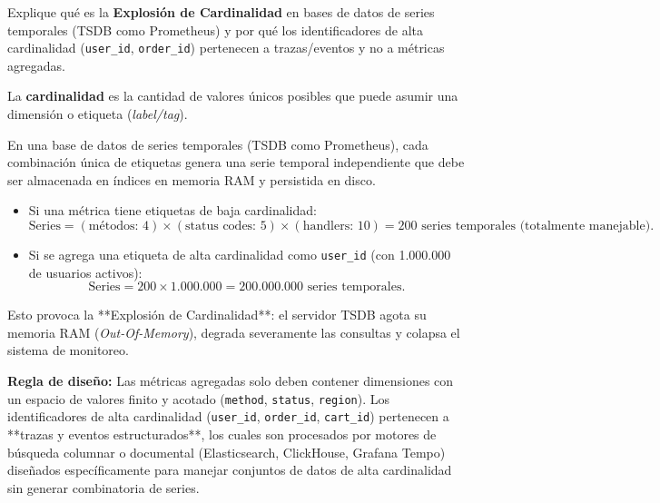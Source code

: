 \documentclass[variant=guia,cover=institutional,mode=screen]{ua-engineering-v6-article}
\begin{document}
\begin{uaexercise}
Explique qué es la \textbf{Explosión de Cardinalidad} en bases de datos de series temporales (TSDB como Prometheus) y por qué los identificadores de alta cardinalidad (\texttt{user\_id}, \texttt{order\_id}) pertenecen a trazas/eventos y no a métricas agregadas.
\end{uaexercise}
\begin{uaanswer}
La \textbf{cardinalidad} es la cantidad de valores únicos posibles que puede asumir una dimensión o etiqueta (\emph{label/tag}).

En una base de datos de series temporales (TSDB como Prometheus), cada combinación única de etiquetas genera una serie temporal independiente que debe ser almacenada en índices en memoria RAM y persistida en disco.
\begin{itemize}
\item Si una métrica tiene etiquetas de baja cardinalidad:
\[
\text{Series} = (\text{métodos: } 4) \times (\text{status codes: } 5) \times (\text{handlers: } 10) = 200 \text{ series temporales (totalmente manejable)}.
\]
\item Si se agrega una etiqueta de alta cardinalidad como \texttt{user\_id} (con 1.000.000 de usuarios activos):
\[
\text{Series} = 200 \times 1.000.000 = 200.000.000 \text{ series temporales}.
\]
\end{itemize}
Esto provoca la **Explosión de Cardinalidad**: el servidor TSDB agota su memoria RAM (\emph{Out-Of-Memory}), degrada severamente las consultas y colapsa el sistema de monitoreo.

\textbf{Regla de diseño:} Las métricas agregadas solo deben contener dimensiones con un espacio de valores finito y acotado (\texttt{method}, \texttt{status}, \texttt{region}). Los identificadores de alta cardinalidad (\texttt{user\_id}, \texttt{order\_id}, \texttt{cart\_id}) pertenecen a **trazas y eventos estructurados**, los cuales son procesados por motores de búsqueda columnar o documental (Elasticsearch, ClickHouse, Grafana Tempo) diseñados específicamente para manejar conjuntos de datos de alta cardinalidad sin generar combinatoria de series.
\end{uaanswer}
\end{document}
